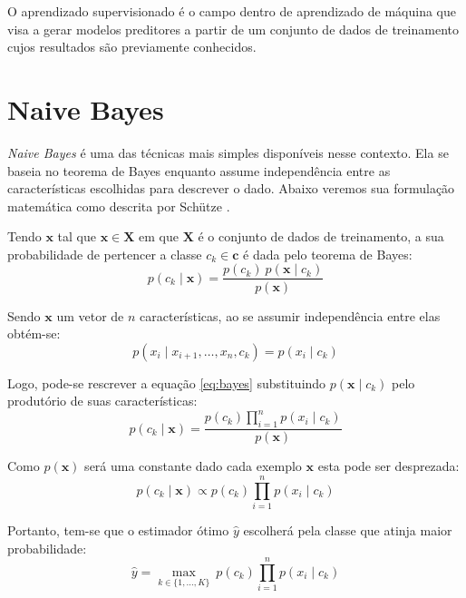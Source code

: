 O aprendizado supervisionado é o campo dentro de aprendizado de máquina que visa a gerar modelos preditores a partir de um conjunto de dados de treinamento cujos resultados são previamente conhecidos.

\section{Naive Bayes}

\textit{Naive Bayes} é uma das técnicas mais simples disponíveis nesse contexto. Ela se baseia no teorema de Bayes enquanto assume independência entre as características escolhidas para descrever o dado. Abaixo veremos sua formulação matemática como descrita por Schütze \cite{schutze08}.

Tendo $\mathbf{x}$ tal que $\mathbf{x} \in \mathbf{X}$ em que $\mathbf{X}$ é o conjunto de dados de treinamento, a sua probabilidade de pertencer a classe $c_k \in \mathbf{c}$ é dada pelo teorema de Bayes:
\begin{equation} \label{eq:bayes}
    p(c_k \mid \mathbf{x}) = \frac{p(c_k) \ p(\mathbf{x} \mid c_k)}{p(\mathbf{x})}
\end{equation}

Sendo $\mathbf{x}$ um vetor de $n$ características, ao se assumir independência entre elas obtém-se:
\begin{equation}
    p(x_i \mid x_{i+1}, \dots ,x_{n}, c_k ) = p(x_i \mid c_k)
\end{equation}

Logo, pode-se rescrever a equação \ref{eq:bayes} substituindo $p(\mathbf{x} \mid c_k)$ pelo produtório de suas características:
\begin{equation}
    p(c_k \mid \mathbf{x}) = \frac{p(c_k) \prod_{i=1}^n p(x_i \mid c_k)}{p(\mathbf{x})}
\end{equation}

Como $p(\mathbf{x})$ será uma constante dado cada exemplo $\mathbf{x}$ esta pode ser desprezada:
\begin{equation}
    p(c_k \mid \mathbf{x}) \propto p(c_k) \prod_{i=1}^n p(x_i \mid c_k)
\end{equation}

Portanto, tem-se que o estimador ótimo $\hat{y}$ escolherá pela classe que atinja maior probabilidade:
\begin{equation}
    \hat{y} = \underset{k \in \{1, \dots, K\}}{\operatorname{max}} \ p(c_k) \displaystyle\prod_{i=1}^n p(x_i \mid c_k)
\end{equation}

